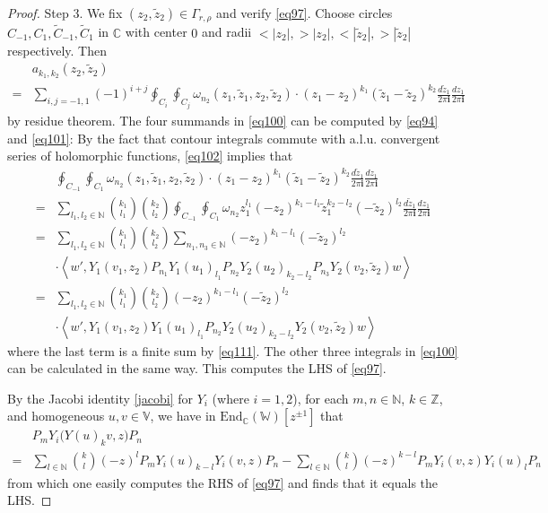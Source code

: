\documentclass[11pt,b5paper,notitlepage]{article}
\theoremstyle{definition}
\theoremstyle{plain}
\newcommand{\wtd}{\widetilde}
\newcommand{\End}{\mathrm{End}} %
\newcommand{\im}{\mathbf{i}}
\newcommand{\Vbb}{\mathbb V}
\newcommand{\Wbb}{\mathbb W}
\newcommand{\Cbb}{\mathbb C}
\newcommand{\Nbb}{\mathbb N}
\newcommand{\Zbb}{\mathbb Z}
\newcommand{\<}{\left\langle}
\renewcommand{\>}{\right\rangle}
\numberwithin{equation}{section}
\begin{document}
\begin{proof}
Step 3. We fix $(z_2,\wtd z_2)\in\Gamma_{r,\rho}$ and verify \eqref{eq97}. Choose circles $C_{-1},C_1,\wtd C_{-1},\wtd C_{1}$ in $\Cbb$ with center $0$ and radii $<|z_2|,>|z_2|,<|\wtd z_2|,>|\wtd z_2|$ respectively. Then
\begin{align}
&a_{k_1,k_2}(z_2,\wtd z_2)\nonumber\\
=&\sum_{i,j=-1,1} (-1)^{i+j}\oint_{C_i}\oint_{C_j}\omega_{n_2}(z_1,\wtd z_1,z_2,\wtd z_2)\cdot (z_1-z_2)^{k_1}(\wtd z_1-\wtd z_2)^{k_2}\frac {d\wtd z_1}{2\pi\im}\frac{d z_1}{2\pi\im}  \label{eq100}
\end{align}
by residue theorem. The four summands in \eqref{eq100} can be computed by \eqref{eq94} and \eqref{eq101}: By the fact that contour integrals commute with a.l.u. convergent series of holomorphic functions, \eqref{eq102} implies that
\begin{align}
&\oint_{C_{-1}}\oint_{C_1}\omega_{n_2}(z_1,\wtd z_1,z_2,\wtd z_2)\cdot (z_1-z_2)^{k_1}(\wtd z_1-\wtd z_2)^{k_2}\frac {d\wtd z_1}{2\pi\im}\frac{d z_1}{2\pi\im}\nonumber\\
=&\sum_{l_1,l_2\in\Nbb}{k_1\choose l_1}{k_2\choose l_2}\oint_{C_{-1}}\oint_{C_1}\omega_{n_2}z_1^{l_1}(-z_2)^{k_1-l_1}\wtd z_1^{k_2-l_2}(-\wtd z_2)^{l_2}\frac{d\wtd z_1}{2\pi\im}\frac{d z_1}{2\pi\im}\nonumber\\
=&\sum_{l_1,l_2\in\Nbb}{k_1\choose l_1}{k_2\choose l_2}\sum_{n_1,n_3\in\Nbb}(-z_2)^{k_1-l_1}(-\wtd z_2)^{l_2} \nonumber\\
~~&\cdot \<w',Y_1(v_1,z_2)P_{n_1}Y_1(u_1)_{l_1}P_{n_2}Y_2(u_2)_{k_2-l_2}P_{n_3}Y_2(v_2,\wtd z_2)w\>\nonumber\\
=&\sum_{l_1,l_2\in\Nbb}{k_1\choose l_1}{k_2\choose l_2}(-z_2)^{k_1-l_1}(-\wtd z_2)^{l_2}\nonumber\\
~~&\cdot \<w',Y_1(v_1,z_2)Y_1(u_1)_{l_1}P_{n_2}Y_2(u_2)_{k_2-l_2}Y_2(v_2,\wtd z_2)w\>
\end{align}
where the last term is a finite sum by \eqref{eq111}. The other three integrals in \eqref{eq100} can be calculated in the same way. This computes the LHS of \eqref{eq97}.

By the Jacobi identity \eqref{jacobi} for $Y_i$ (where $i=1,2$), for each $m,n\in\Nbb$, $k\in\Zbb$, and homogeneous $u,v\in\Vbb$, we have in $\End_\Cbb(\Wbb)[z^{\pm1}]$ that
\begin{align*}
&P_mY_i\big(Y(u)_kv,z\big)P_n\\
=&\sum_{l\in\Nbb} {k\choose l}(-z)^lP_mY_i(u)_{k-l}Y_i(v,z)P_n-\sum_{l\in\Nbb}{k\choose l}(-z)^{k-l}P_mY_i(v,z)Y_i(u)_lP_n
\end{align*}
from which one easily computes the RHS of \eqref{eq97} and finds that it equals the LHS.
\end{proof}
\end{document}
